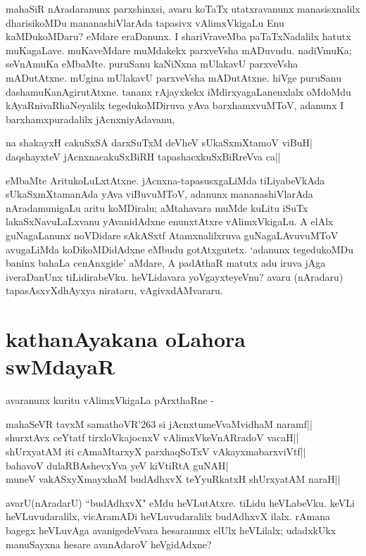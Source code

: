 mahaSiR nAradaranunx parxshinxsi, avaru koTaTx utatxravanunx manasisxnalilx dharisikoMDu mananashiVlarAda tapasivx  vAlimxVkigaLu  Enu kaMDukoMDaru? eMdare eraDanunx. I shariVraveMba paTaTxNadalilx  hatutx muKagaLave. muKaveMdare muMdakekx  parxveVsha mADuvudu. nadiVmuKa; seVnAmuKa eMbaMte. puruSanu kaNiNxna mUlakavU parxveVsha mADutAtxne. mUgina mUlakavU parxveVsha mADutAtxne. hiVge puruSanu dashamuKanAgirutAtxne. tananx rAjayxkekx iMdirxyagaLanenxlalx oMdoMdu kAyaRnivaRhaNeyalilx tegedukoMDiruva yAva barxhamxvuMToV, adanunx I barxhamxpuradalilx jAcnxniyAdavanu,
\begin{shloka}
na shakayxH cakuSxSA darxSuTxM deVheV sUkaSxmXtamoV viBuH|\label{246}\\
daqshayxteV jAcnxnacakuSxBiRH tapashacxkuSxBiRreVva ca|| 
\end{shloka}
eMbaMte AritukoLuLxtAtxne. jAcnxna-tapasusxgaLiMda tiLiyabeVkAda sUkaSxmXtamanAda yAva viBuvuMToV, adanunx mananashiVlarAda nAradamunigaLu aritu koMDiralu; aMtahavara muMde kuLitu iSuTx lakaSxNavuLaLxvanu yAvanidAdxne enunxtAtxre vAlimxVkigaLu. A‌ elAlx guNagaLanunx noVDidare sAkASxtf Atamxnalilxruva guNagaLAvuvuMToV avugaLiMda koDikoMDidAdxne eMbudu gotAtxgutetx. `adanunx tegedukoMDu baninx bahaLa cenAnxgide' aMdare, A padAthaR matutx adu iruva jAga iveraDanUnx tiLidirabeVku. heVLidavara yoVgayxteyeVnu? avaru (nAradaru) tapasAsxvXdhAyxya nirataru, vAgivxdAMvararu.

\section*{kathanAyakana oLahora swMdayaR}

avaranunx kuritu vAlimxVkigaLa pArxthaRne -

\begin{shloka}
mahaSeVR tavxM samathoVR\char'263 si jAcnxtumeVvaMvidhaM naramf||\label{246a}\\
shurxtAvx ceYtatf tirxloVkajocnxV vAlimxVkeVnARradoV vacaH||\label{246b}\\
shUrxyatAM iti cAmaMtarxyX parxhaqSoTxV vAkayxmabarxviVtf||\\
bahavoV dulaRBAshevxYva yeV kiVtiRtA guNAH|\label{247c}\\
muneV vakASxyXmayxhaM budAdhxvX teYyuRkatxH shUrxyatAM naraH||\\
\end{shloka}

avarU(nAradarU) ``budAdhxvX" eMdu heVLutAtxre. tiLidu heVLabeVku. keVLi heVLuvudaralilx, vicAramADi heVLuvudaralilx budAdhxvX ilalx. rAmana bagegx heVLuvAga avanigedeVvara hesaranunx elUlx heVLilalx; udadxkUkx manuSayxna hesare avanAdaroV heVgidAdxne? 

